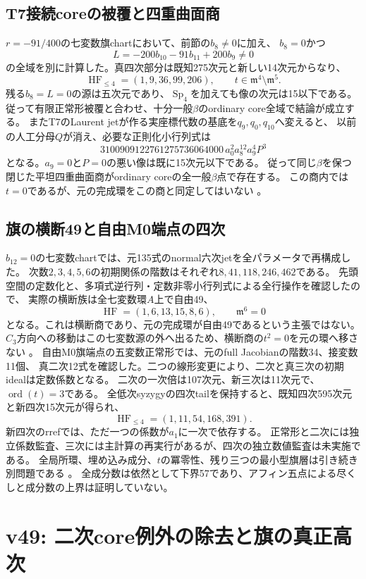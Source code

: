 \documentclass[11pt,a4paper]{ltjsarticle}
\theoremstyle{remark}
\begin{document}
\subsection{T7接続coreの被覆と四重曲面商}
$r=-91/400$の七変数旗chartにおいて、前節の$b_8\ne0$に加え、
$b_8=0$かつ
\[
 L=-200b_{10}-91b_{11}+200b_9\ne0
\]
の全域を別に計算した。真四次部分は既知275次元と新しい14次元からなり、
\[
 \operatorname{HF}_{\le4}=(1,9,36,99,206),\qquad
 t\in\mathfrak m^4\setminus\mathfrak m^5.
\]
残る$b_8=L=0$の源は五次元であり、$\operatorname{Sp}_4$を加えても像の次元は15以下である。
従って有限正常形被覆と合わせ、十分一般$\beta$のordinary core全域で結論が成立する。
またT7のLaurent jetが作る実座標代数の基底を$q_9,q_0,q_{10}$へ変えると、
以前の人工分母$Q$が消え、必要な正則化小行列式は
\[
 3100909122761275736064000\,a_0^2a_8^{12}a_9^4P^3
\]
となる。$a_9=0$と$P=0$の悪い像は既に15次元以下である。
従って同じ$\beta$を保つ閉じた平坦四重曲面商がordinary coreの全一般$\beta$点で存在する。
この商内では$t=0$であるが、元の完成環をこの商と同定してはいない
\cite{socle-cover-v48,t7-cover-v48}。

\subsection{旗の横断49と自由M0端点の四次}
$b_{12}=0$の七変数chartでは、元135式のnormal六次jetを全パラメータで再構成した。
次数$2,3,4,5,6$の初期関係の階数はそれぞれ$8,41,118,246,462$である。
先頭空間の定数化と、多項式逆行列・定数非零小行列式による全行操作を確認したので、
実際の横断族は全七変数環$A$上で自由49、
\[
 \operatorname{HF}=(1,6,13,15,8,6),\qquad\mathfrak m^6=0
\]
となる。これは横断商であり、元の完成環が自由49であるという主張ではない。
$C_3$方向への移動はこの七変数源の外へ出るため、横断商の$t^2=0$を元の環へ移さない
\cite{zero12-49-v48}。
自由M0旗端点の五変数正常形では、元のfull Jacobianの階数34、接変数11個、
真二次12式を確認した。二つの線形変更により、二次と真三次の初期idealは定数係数となる。
二次の一次倍は107次元、新三次は11次元で、$\operatorname{ord}(t)=3$である。
全低次syzygyの四次tailを保持すると、既知四次595次元と新四次15次元が得られ、
\[
 \operatorname{HF}_{\le4}=(1,11,54,168,391).
\]
新四次のrrefでは、ただ一つの係数が$a_1$に一次で依存する。
正常形と二次には独立係数監査、三次には主計算の再実行があるが、四次の独立数値監査は未実施である。
全局所環、埋め込み成分、$t$の冪零性、残り三つの最小型旗層は引き続き別問題である
\cite{free-low-v48,free-four-v48}。
全成分数は依然として下界57であり、アフィン五点による尽くしと成分数の上界は証明していない。

\section{v49: 二次core例外の除去と旗の真正高次}
\label{sec:v49}
\end{document}

